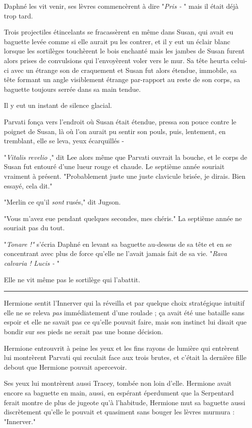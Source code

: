 Daphné les vit venir, ses lèvres commencèrent à dire "\emph{Pris -} " mais il était déjà trop tard.

Trois projectiles étincelants se fracassèrent en même dans Susan, qui avait eu baguette levée comme si elle aurait pu les contrer, et il y eut un éclair blanc lorsque les sortilèges touchèrent le bois enchanté mais les jambes de Susan furent alors prises de convulsions qui l'envoyèrent voler vers le mur. Sa tête heurta celui-ci avec un étrange son de craquement et Susan fut alors étendue, immobile, sa tête formant un angle visiblement étrange par-rapport au reste de son corps, sa baguette toujours serrée dans sa main tendue.

Il y eut un instant de silence glacial.

Parvati fonça vers l'endroit où Susan était étendue, pressa son pouce contre le poignet de Susan, là où l'on aurait pu sentir son pouls, puis, lentement, en tremblant, elle se leva, yeux écarquillés -

"\emph{Vitalis revelio} ," dit Lee alors même que Parvati ouvrait la bouche, et le corps de Susan fut entouré d'une lueur rouge et chaude. Le septième année souriait vraiment à présent. "Probablement juste une juste clavicule brisée, je dirais. Bien essayé, cela dit."

"Merlin ce qu'il \emph{sont}  rusés," dit Jugson.

"Vous m'avez eue pendant quelques secondes, mes chéris." La septième année ne souriait pas du tout.

"\emph{Tonare !" } s'écria Daphné en levant sa baguette au-dessus de sa tête et en se concentrant avec plus de force qu'elle ne l'avait jamais fait de sa vie. "\emph{Rava calvaria ! Lucis -} "

Elle ne vit même pas le sortilège qui l'abattit.
\par\noindent\rule{\textwidth}{0.4pt}
Hermione sentit l'Innerver qui la réveilla et par quelque choix stratégique intuitif elle ne se releva \emph{pas}  immédiatement d'une roulade ; ça avait été une bataille sans espoir et elle ne savait pas ce qu'elle pouvait faire, mais son instinct lui disait que bondir sur ses pieds ne serait pas une bonne décision.

Hermione entrouvrit à peine les yeux et les fins rayons de lumière qui entrèrent lui montrèrent Parvati qui reculait face aux trois brutes, et c'était la dernière fille debout que Hermione pouvait apercevoir.

Ses yeux lui montrèrent aussi Tracey, tombée non loin d'elle. Hermione avait encore sa baguette en main, aussi, en espérant éperdument que la Serpentard ferait montre de plus de jugeote qu'à l'habitude, Hermione mut sa baguette aussi discrètement qu'elle le pouvait et quasiment sans bouger les lèvres murmura : "Innerver."

